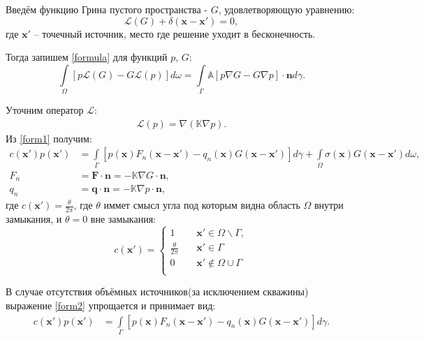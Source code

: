 	Введём функцию Грина пустого пространства - $G$, удовлетворяющую уравнению:
\begin{equation}
	\label{green}
	\mathcal{L}(G) + \delta(\mathbf{x}-\mathbf{x}') = 0,
\end{equation}
	где $\mathbf{x}'$ -- точечный источник, место где решение уходит в бесконечность.
	
	Тогда запишем \eqref{formula} для функций $p$, $G$:
\begin{equation}
	\label{form1}
	\int\limits_\Omega \left[p\mathcal{L}(G)-G\mathcal{L}(p)\right]d\omega = \int\limits_\Gamma \mathbb{A}\left[p\nabla G - G\nabla p\right] \cdot \mathbf{n}d\gamma.
\end{equation}
	
	Уточним оператор $\mathcal{L}$:
\begin{align}
	\label{operator1}
	\mathcal{L}(p) = \nabla(\mathbb{K}\nabla p).
\end{align}
	Из \eqref{form1} получим:
\begin{align}
	\label{form2}
	c(\mathbf{x}')p(\mathbf{x}') &= \int\limits_\Gamma \left[p(\mathbf{x})F_n(\mathbf{x}-\mathbf{x}')-q_n(\mathbf{x})G(\mathbf{x}-\mathbf{x}')\right]d\gamma + \int\limits_\Omega \sigma(\mathbf{x}) G(\mathbf{x}-\mathbf{x}') d\omega,\\
	F_n &= \mathbf{F} \cdot \mathbf{n} = -\mathbb{K}\nabla G \cdot \mathbf{n},\\
	q_n &= \mathbf{q} \cdot \mathbf{n} = -\mathbb{K}\nabla p \cdot \mathbf{n},
\end{align}	
	где $c(\mathbf{x'}) = \frac{\theta}{2\pi}$, где $\theta$ иммет смысл угла под которым видна область $\Omega$ внутри замыкания, и $\theta = 0$ вне замыкания:
\begin{equation}
	\label{cc}
	c(\mathbf{x}') =  
	\begin{cases}
    		1       & \quad \mathbf{x}' \in {\Omega} \backslash \Gamma, \\
    		\displaystyle\frac{\theta}{2\pi}       & \quad \mathbf{x}' \in \Gamma \\
		0  & \quad \mathbf{x}' \notin \Omega \cup \Gamma \\
	\end{cases}
\end{equation}

	В случае отсутствия объёмных источников(за исключением скважины) выражение \eqref{form2} упрощается и принимает вид:
\begin{align}
	\label{form3}
	c(\mathbf{x}')p(\mathbf{x}') &= \int\limits_\Gamma \left[p(\mathbf{x})F_n(\mathbf{x}-\mathbf{x}')-q_n(\mathbf{x})G(\mathbf{x}-\mathbf{x}')\right]d\gamma.
\end{align}

